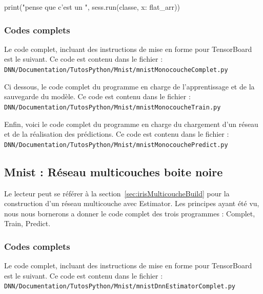 \documentclass[a4paper,11pt]{book}
\begin{document}
\begin{mypython}
print("\nJe pense que c'est un ", sess.run(classe, {x: flat_arr}))
\end{mypython}

\subsubsection{Codes complets }
Le code complet, incluant des instructions de mise en forme pour TensorBoard est le suivant. Ce code est contenu dans le fichier :\\
\verb+DNN/Documentation/TutosPython/Mnist/mnistMonocoucheComplet.py+



Ci dessous, le code complet du programme en charge de l'apprentissage et de la sauvegarde du modèle. Ce code est contenu dans le fichier :\\
\verb+DNN/Documentation/TutosPython/Mnist/mnistMonocoucheTrain.py+



Enfin, voici le code complet du programme en charge du chargement d'un réseau et de la réalisation des prédictions. Ce code est contenu dans le fichier :\\
\verb+DNN/Documentation/TutosPython/Mnist/mnistMonocouchePredict.py+




\subsection{Mnist : Réseau multicouches boite noire}
\label{secMnistMulti}

Le lecteur peut se référer à la section~\ref{sec:irisMulticoucheBuild} pour la construction d'un réseau multicouche avec Estimator.
Les principes ayant été vu, nous nous bornerons a donner le code complet des trois programmes : Complet, Train, Predict.

\subsubsection{Codes complets }
Le code complet, incluant des instructions de mise en forme pour TensorBoard est le suivant. Ce code est contenu dans le fichier :\\
\verb+DNN/Documentation/TutosPython/Mnist/mnistDnnEstimatorComplet.py+
\end{document}
